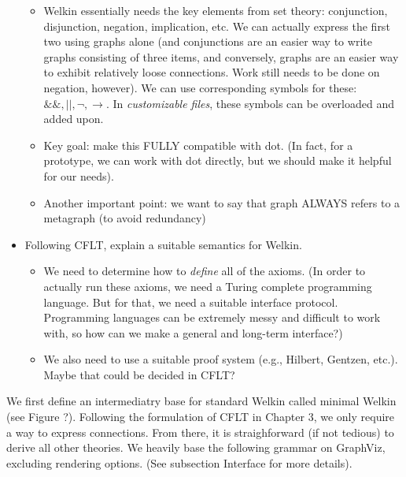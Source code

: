 \begin{itemize}
\begin{itemize}
			            \item Welkin essentially needs the key elements from set theory: conjunction, disjunction, negation, implication, etc. We can actually express the first two using graphs alone (and conjunctions are an easier way to write graphs consisting of three items, and conversely, graphs are an easier way to exhibit relatively loose connections. Work still needs to be done on negation, however). We can use corresponding symbols for these: $\&\&, ||, \neg, \rightarrow$. In \textit{customizable files}, these symbols can be overloaded and added upon.
			            \item Key goal: make this FULLY compatible with dot. (In fact, for a prototype, we can work with dot directly, but we should make it helpful for our needs).
									\item Another important point: we want to say that graph ALWAYS refers to a metagraph (to avoid redundancy)		            \end{itemize}
	\item Following CFLT, explain a suitable semantics for Welkin.
	      \begin{itemize}
		      \item We need to determine how to \textit{define} all of the axioms. (In order to actually run these axioms, we need a Turing complete programming language. But for that, we need a suitable interface protocol. Programming languages can be extremely messy and difficult to work with, so how can we make a general and long-term interface?)
		      \item We also need to use a suitable proof system (e.g., Hilbert, Gentzen, etc.). Maybe that could be decided in CFLT?
	      \end{itemize}
\end{itemize}

We first define an intermediatry base for standard Welkin called minimal Welkin (see Figure ?). Following the formulation of CFLT in Chapter 3, we only require a way to express connections. From there, it is straighforward (if not tedious) to derive all other theories. We heavily base the following grammar on GraphViz, excluding rendering options. (See subsection Interface for more details).

